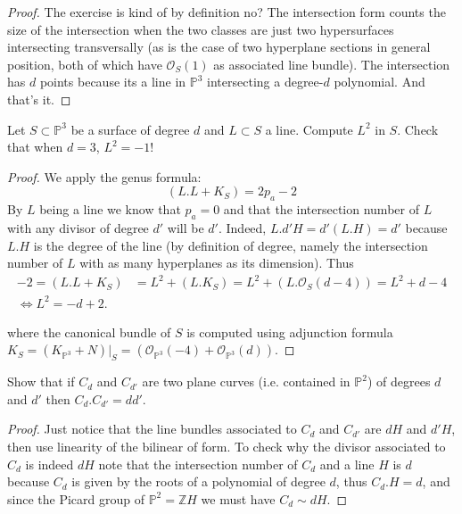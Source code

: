 \documentclass{book}
\begin{document}
\begin{proof}
The exercise is kind of by definition no?
The intersection form counts the size of the
intersection when
the two classes are just two hypersurfaces
intersecting transversally (as is the case of
two
hyperplane sections in general position,
both of which have $\mathcal{O}_S(1)$ as
associated line bundle). The intersection
has $d$ points because its a line in
$\mathbb{P}^3$
intersecting a degree-$d$ polynomial.
And that's it.
\end{proof}

\begin{exercise}
\label{exercise-intersection-lines}
Let $S \subset \mathbb{P}^3$ be a surface
of degree $d$ and $L \subset S$ a line.
Compute $L^2$ in $S$. Check that when $d=3$,
$L^2=-1$!
\end{exercise}

\begin{proof}
We apply the genus formula:
$$
(L.L+K_S)=2p_a-2
$$
By $L$ being a line we know that $p_a=0$
and that the intersection number of $L$
with any divisor of degree $d'$ will be $d'$.
Indeed, $L.d'H=d'(L.H)=d'$
because $L.H$ is the degree of the line
(by definition of degree, namely
the intersection number of $L$ with as many
hyperplanes as its dimension).
Thus
$$
\begin{aligned}
-2=(L.L+K_S)&=L^2+(L.K_S)=L^2+(L.\mathcal{O}
_S(d-4))
=L^2+d-4\\
\iff L^2=-d+2.
\end{aligned}
$$

\noindent
where the canonical bundle of $S$
is computed using adjunction formula
$K_S=(K_{\mathbb{P}^3}+N)|_S
=(\mathcal{O}_{\mathbb{P}^3}(-4)+\mathcal{O}
_{\mathbb{P}^3}(d))$.
\end{proof}

\begin{exercise}[Bézout]
\label{exercise-bezout}
Show that if $C_d$ and $C_{d'}$ are two plane
curves
(i.e. contained in $\mathbb{P}^2$)
of degrees $d$ and $d'$ then
$C_d.C_{d'}=dd'$.
\end{exercise}

\begin{proof}
Just notice that the line bundles associated
to
$C_d$ and $C_{d'}$ are $dH$ and $d'H$,
then use linearity of the bilinear of form.
To check why the divisor associated to $C_d$
is indeed $dH$ note that the intersection
number
of $C_d$ and a line $H$ is $d$ because $C_d$
is given by the roots of a polynomial of
degree $d$,
thus $C_d.H=d$, and since the Picard group of
$\mathbb{P}^2=\mathbb{Z}H$
we must have $C_d \sim dH$.
\end{proof}
\end{document}
